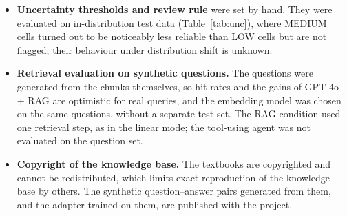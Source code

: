 \begin{itemize}
  \item \textbf{Uncertainty thresholds and review rule} were set by hand. They were evaluated on in-distribution test data (Table~\ref{tab:unc}), where MEDIUM cells turned out to be noticeably less reliable than LOW cells but are not flagged; their behaviour under distribution shift is unknown.
  \item \textbf{Retrieval evaluation on synthetic questions.} The questions were generated from the chunks themselves, so hit rates and the gains of GPT-4o + RAG are optimistic for real queries, and the embedding model was chosen on the same questions, without a separate test set. The RAG condition used one retrieval step, as in the linear mode; the tool-using agent was not evaluated on the question set.
  \item \textbf{Copyright of the knowledge base.} The textbooks are copyrighted and cannot be redistributed, which limits exact reproduction of the knowledge base by others. The synthetic question--answer pairs generated from them, and the adapter trained on them, are published with the project.
\end{itemize}

\clearpage
